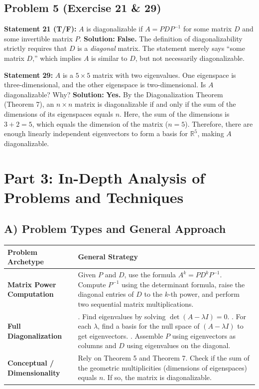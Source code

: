 \documentclass[11pt, a4paper]{article}
\theoremstyle{definition}
\theoremstyle{remark}
\newcommand{\R}{\mathbb{R}}
\begin{document}
\subsection{Problem 5 (Exercise 21 \& 29)}
\textbf{Statement 21 (T/F):} $A$ is diagonalizable if $A = PDP^{-1}$ for some matrix $D$ and some invertible matrix $P$.
\textbf{Solution:} \textbf{False.} The definition of diagonalizability strictly requires that $D$ is a \textit{diagonal} matrix. The statement merely says ``some matrix $D$,'' which implies $A$ is similar to $D$, but not necessarily diagonalizable.

\textbf{Statement 29:} $A$ is a $5 \times 5$ matrix with two eigenvalues. One eigenspace is three-dimensional, and the other eigenspace is two-dimensional. Is $A$ diagonalizable? Why?
\textbf{Solution:} \textbf{Yes.} By the Diagonalization Theorem (Theorem 7), an $n \times n$ matrix is diagonalizable if and only if the sum of the dimensions of its eigenspaces equals $n$. Here, the sum of the dimensions is $3 + 2 = 5$, which equals the dimension of the matrix ($n=5$). Therefore, there are enough linearly independent eigenvectors to form a basis for $\R^5$, making $A$ diagonalizable.

\newpage
\section{Part 3: In-Depth Analysis of Problems and Techniques}

\subsection{A) Problem Types and General Approach}
\renewcommand{\arraystretch}{1.5}
\begin{tabularx}{\textwidth}{>{\hsize=0.3\hsize\bfseries}X >{\hsize=0.7\hsize}X}
\toprule
Problem Archetype & General Strategy \\
\midrule
Matrix Power Computation & Given $P$ and $D$, use the formula $A^k = PD^kP^{-1}$. Compute $P^{-1}$ using the determinant formula, raise the diagonal entries of $D$ to the $k$-th power, and perform two sequential matrix multiplications. \\
\addlinespace[4pt]
Full Diagonalization & 1. Find eigenvalues by solving $\det(A - \lambda I) = 0$. \newline 2. For each $\lambda$, find a basis for the null space of $(A - \lambda I)$ to get eigenvectors. \newline 3. Assemble $P$ using eigenvectors as columns and $D$ using eigenvalues on the diagonal. \\
\addlinespace[4pt]
Conceptual / Dimensionality & Rely on Theorem 5 and Theorem 7. Check if the sum of the geometric multiplicities (dimensions of eigenspaces) equals $n$. If so, the matrix is diagonalizable. \\
\bottomrule
\end{tabularx}
\end{document}
